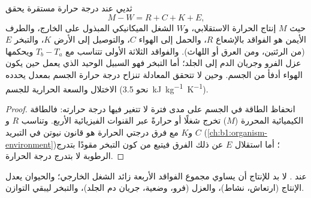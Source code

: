 \begin{proposition}\label{prop:b1:mammal-organization:heatbudget}
ثديي عند درجة حرارة مستقرة يحقق
\[
M - W = R + C + K + E ,
\]
حيث $M$ إنتاج الحرارة الاستقلابي، و$W$ الشغل الميكانيكي المبذول على
الخارج، والطرف الأيمن هو الفواقد بالإشعاع $R$، والحمل إلى الهواء
$C$، والتوصيل إلى الأرض $K$، والتبخر $E$ (من الرئتين، ومن العرق أو
اللهاث). والفواقد الثلاثة الأولى تتناسب مع $T_b - T_a$ ويحكمها عزل
الفرو وجريان الدم إلى الجلد؛ أما التبخر فهو السبيل الوحيد الذي يعمل
حين يكون الهواء أدفأ من الجسم. وحين لا تتحقق المعادلة تنزاح درجة
حرارة الجسم بمعدل يحدده الاختلال والسعة الحرارية للجسم (نحو
\qty{3.5}{kJ.kg^{-1}.K^{-1}}).
\end{proposition}
\begin{proof}
انحفاظ الطاقة في الجسم على مدى فترة لا تتغير فيها درجة حرارته:
فالطاقة الكيميائية المحررة ($M$) تخرج شغلًا أو حرارةً عبر القنوات
الفيزيائية الأربع. وتناسب $R$ و$C$ و$K$ مع فرق درجتي الحرارة هو
قانون نيوتن في التبريد (\cref{ch:b1:organism-environment})؛ أما
استقلال $E$ عن ذلك الفرق فيتبع من كون التبخر مقودًا بتدرج الرطوبة لا
بتدرج درجة الحرارة.
\end{proof}

\begin{omfigure}

{\small {} عند . لا بد للإنتاج أن يساوي
مجموع الفواقد الأربعة زائد الشغل الخارجي؛ والحيوان يعدل الإنتاج
(ارتعاش، نشاط)، والعزل (فرو، وضعية، جريان دم الجلد)، والتبخر ليبقي
التوازن.}
\end{omfigure}

